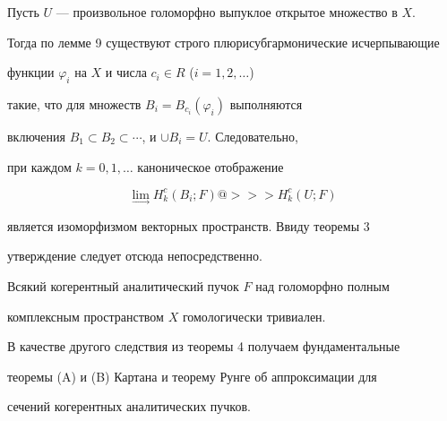 \begin{pf} 


Пусть $U$ --- произвольное голоморфно выпуклое открытое множество в $X$. 


Тогда по лемме 9 существуют строго плюрисубгармонические исчерпывающие 


функции $\varphi_i$ на $X$ и числа $c_i\in R$ ($i=1,2,\dotsc$) 


такие, что для множеств $B_i=B_{c_i}(\varphi_i)$ выполняются 


включения $B_1\subset B_2\subset\dotsb$, и $\cup B_i=U$. Следовательно, 


при каждом $k=0,1,\dotsc$ каноническое отображение 


$$ 


\lim_{\to}H^c_k(B_i;F)@>>>H^c_k(U;F) 


$$ 


является изоморфизмом векторных пространств. Ввиду теоремы 3 


утверждение следует отсюда непосредственно. 


\end{pf} 


 


\begin{cor} 


Всякий когерентный аналитический пучок $F$ над голоморфно полным 


комплексным пространством $X$ гомологически тривиален. 


\end{cor} 


 


В качестве другого следствия из теоремы 4 получаем фундаментальные 


теоремы (A) и (B) Картана \cite{2} и теорему Рунге об аппроксимации для 


сечений когерентных аналитических пучков. 


 


